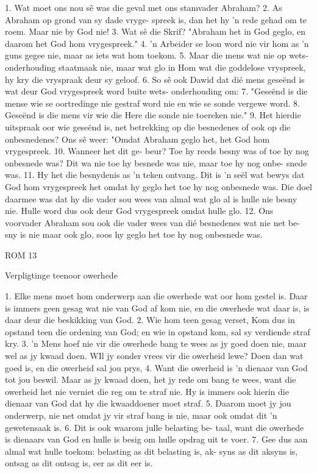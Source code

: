 1.  Wat moet ons nou sê was die geval 
met ons stamvader Abraham?  2.  As 
Abraham op grond van sy dade vryge-
spreek is, dan het hy 'n rede gehad om te 
roem.  Maar nie by God nie!  3.  Wat sê die 
Skrif?  "Abraham het in God geglo, en 
daarom het God hom vrygespreek."  4.  'n 
Arbeider se loon word nie vir hom as 'n 
guns gegee nie, maar as iets wat hom 
toekom.  5.  Maar die mens wat nie op wets-
onderhouding staatmaak nie, maar wat 
glo in Hom wat die goddelose vryspreek, 
hy kry die vryspraak deur sy geloof.  6.  So 
sê ook Dawid dat dié mens geseënd is wat 
deur God vrygespreek word buite wets-
onderhouding om:
7.  "Geseënd is die mense 
wie se oortredinge 
nie gestraf word nie 
en wie se sonde vergewe word.
8.  Geseënd is die mens vir wie die Here
die sonde nie toereken nie."
9.  Het hierdie uitspraak oor wie geseënd 
is, net betrekking op die besnedenes of 
ook op die onbesnedenes?  Ons sê weer:  
"Omdat Abraham geglo het, het God 
hom vrygespreek.  10.  Wanneer het dit ge-
beur?  Toe hy reeds besny was of toe hy 
nog onbesnede was?  Dit wa nie toe hy 
besnede was nie, maar toe hy nog onbe-
snede was.  11.  Hy het die besnydenis as 'n 
teken ontvang.  Dit is 'n seël wat bewys 
dat God hom vrygespreek het omdat hy 
geglo het toe hy nog onbesnede was.  Die 
doel daarmee was dat hy die vader sou 
wees van almal wat glo al is hulle nie 
besny nie.  Hulle word dus ook deur God 
vrygespreek omdat hulle glo.  12.  Ons 
voorvader Abraham sou ook die vader 
wees van dié besnedenes wat nie net be-
sny is nie maar ook glo, soos hy geglo het
toe hy nog onbesnede was.














ROM 13

Verpligtinge teenoor owerhede

1.  Elke mens moet hom onderwerp 
aan die owerhede wat oor hom 
gestel is.  Daar is immers geen gesag wat 
nie van God af kom nie, en die owerhede 
wat daar is, is daar deur die beskikking 
van God.  2.  Wie hom teen gesag verset, 
Kom dus in opstand teen die ordening 
van God; en wie in opstand kom, sal sy 
verdiende straf kry.  3.  'n Mens hoef nie vir 
die owerhede bang te wees as jy goed 
doen nie, maar wel as jy kwaad doen.  WIl 
jy sonder vrees vir die owerheid lewe?  
Doen dan wat goed is, en die owerheid 
sal jou prys, 4.  Want die owerheid is 'n 
dienaar van God tot jou beswil.  Maar as 
jy kwaad doen, het jy rede om bang te 
wees, want die owerheid het nie verniet 
die reg om te straf nie.  Hy is immers ook 
hierin die dienaar van God dat hy die 
kwaaddoener moet straf.  5.  Daarom moet 
jy jou onderwerp, nie net omdat jy vir 
straf bang is nie, maar ook omdat dit 'n 
gewetensaak is.
6.  Dit is ook waarom julle belasting be-
taal, want die owerhede is dienaars van 
God en hulle is besig om hulle opdrag uit 
te voer.  7.  Gee dus aan almal wat hulle 
toekom:  belasting as dit belasting is, ak-
syns as dit aksyns is, ontsag as dit ontsag 
is, eer as dit eer is.
